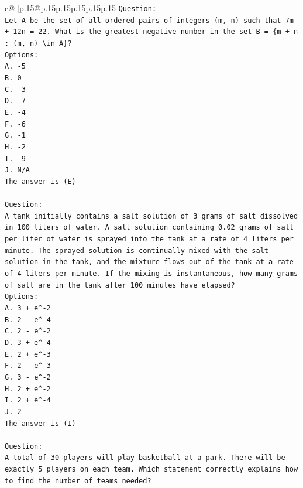 \documentclass{article}
\begin{document}
{\begin{supertabular}{c@{$\;$}|p{.15\linewidth}@{}p{.15\linewidth}p{.15\linewidth}p{.15\linewidth}p{.15\linewidth}p{.15\linewidth}}
{{{\texttt{Question:} \\
\texttt{Let A be the set of all ordered pairs of integers (m, n) such that 7m + 12n = 22. What is the greatest negative number in the set B = \{m + n : (m, n) \textbackslash{}in A\}?} \\
\texttt{Options:} \\
\texttt{A. {-}5} \\
\texttt{B. 0} \\
\texttt{C. {-}3} \\
\texttt{D. {-}7} \\
\texttt{E. {-}4} \\
\texttt{F. {-}6} \\
\texttt{G. {-}1} \\
\texttt{H. {-}2} \\
\texttt{I. {-}9} \\
\texttt{J. N/A} \\
\texttt{The answer is (E)} \\
\\ 
\texttt{Question:} \\
\texttt{A tank initially contains a salt solution of 3 grams of salt dissolved in 100 liters of water. A salt solution containing 0.02 grams of salt per liter of water is sprayed into the tank at a rate of 4 liters per minute. The sprayed solution is continually mixed with the salt solution in the tank, and the mixture flows out of the tank at a rate of 4 liters per minute. If the mixing is instantaneous, how many grams of salt are in the tank after 100 minutes have elapsed?} \\
\texttt{Options:} \\
\texttt{A. 3 + e\^{}{-}2} \\
\texttt{B. 2 {-} e\^{}{-}4} \\
\texttt{C. 2 {-} e\^{}{-}2} \\
\texttt{D. 3 + e\^{}{-}4} \\
\texttt{E. 2 + e\^{}{-}3} \\
\texttt{F. 2 {-} e\^{}{-}3} \\
\texttt{G. 3 {-} e\^{}{-}2} \\
\texttt{H. 2 + e\^{}{-}2} \\
\texttt{I. 2 + e\^{}{-}4} \\
\texttt{J. 2} \\
\texttt{The answer is (I)} \\
\\ 
\texttt{Question:} \\
\texttt{A total of 30 players will play basketball at a park. There will be exactly 5 players on each team. Which statement correctly explains how to find the number of teams needed?} \\
}}}
\end{supertabular}}
\end{document}

